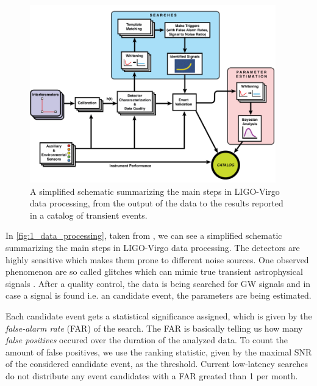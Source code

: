 \begin{figure}[ht]
  \includegraphics[width=0.95\textwidth]{img/1_introduction/data_processing.png}
  \caption{A simplified schematic summarizing the main steps in LIGO-Virgo data
           processing, from the output of the data to the results reported in a
           catalog of transient events.}
  \label{fig:1_data_processing}
  \centering
\end{figure}

In \autoref{fig:1_data_processing}, taken from \cite{2020CQGra..37e5002A},
we can see a simplified schematic summarizing the main steps in LIGO-Virgo data
processing. The detectors are highly sensitive which makes them prone to
different noise sources. One observed phenomenon are so called glitches which
can mimic true transient astrophysical signals \cite{2020CQGra..37e5002A}.
After a quality control, the data is being searched for GW signals and in case
a signal is found i.e. an candidate event, the parameters are being estimated.

Each candidate event gets a statistical significance assigned, which is given by the 
\textit{false-alarm rate} (FAR) of the search.\cite{2020CQGra..37e5002A} The FAR is
basically telling us how many \textit{false positives}
occured over the duration of the analyzed data. To count the amount of
false positives, we use the ranking statistic, given by the maximal SNR
of the considered candidate event, as the threshold. Current low-latency searches
do not distribute any event candidates with a FAR greated than 1 per month.
\cite{PhysRevD.98.024050}

